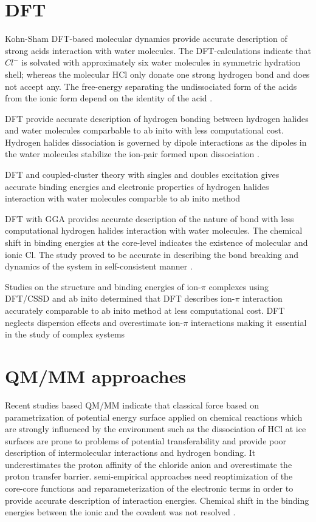 \documentclass[a4paper,11pt]{report}
\begin{document}
\section{DFT}
Kohn-Sham DFT-based molecular dynamics provide accurate description of strong acids interaction with water molecules. The DFT-calculations 
indicate that $Cl^{-}$ is solvated with approximately six water molecules in symmetric hydration shell; whereas the molecular HCl only donate 
one strong hydrogen bond and does not accept any. The free-energy separating the undissociated form of the acids from the ionic form depend 
on the identity of the acid \citep{baer2014investigation}.

DFT provide accurate description of hydrogen bonding between hydrogen halides and water molecules comparbable to ab inito with less computational 
cost. Hydrogen halides dissociation is governed by dipole interactions as the dipoles in the water molecules stabilize the ion-pair formed upon 
dissociation \citep{cabaleiro2002computational}.

DFT and coupled-cluster theory with singles and doubles excitation gives accurate binding energies and electronic properties 
of hydrogen halides interaction with water molecules comparble to ab inito method \citep{odde2004dissociation}

DFT with GGA provides accurate description of the nature of bond with less computational hydrogen halides interaction with water molecules. The 
chemical shift in binding energies at the core-level indicates the existence of molecular and ionic Cl. The study proved to be accurate in 
describing the bond breaking and dynamics of the system in self-consistent manner \citep{calatayud2003ionization}.

Studies on the structure and binding energies of ion-$\pi$ complexes using DFT/CSSD and ab inito determined that DFT describes ion-$\pi$ 
interaction accurately comparable to ab inito method at less computational cost. DFT neglects dispersion effects and overestimate ion-$\pi$ 
interactions making it essential in the study of complex systems \citep{quinonero2005structure}

\section{QM/MM approaches}
Recent studies based QM/MM indicate that classical force based on parametrization of potential energy surface applied on chemical reactions
which are strongly influenced by the environment such as the dissociation of HCl at ice surfaces are prone to problems of potential 
transferability and provide poor description of intermolecular interactions and  hydrogen bonding. It underestimates the proton 
affinity of the chloride anion and overestimate the proton transfer barrier. semi-empirical approaches need reoptimization of the core-core 
functions and reparameterization of the electronic terms in order to provide accurate description of interaction energies. 
Chemical shift in the binding energies between the ionic and the covalent was not resolved \citep{arillo2007can}.
\end{document}

